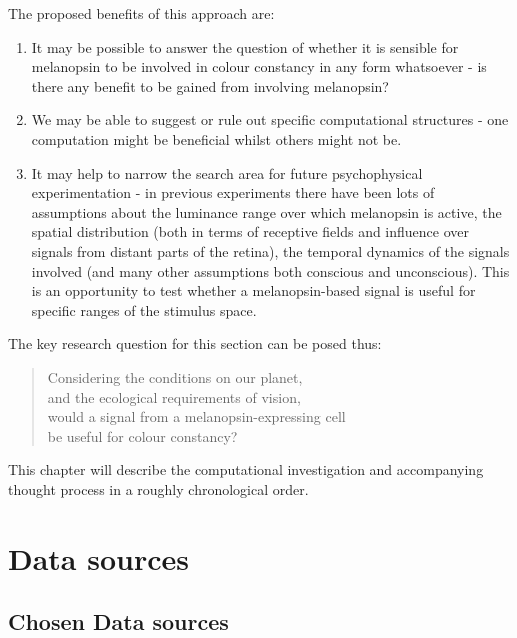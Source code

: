 \noindent The proposed benefits of this approach are: 
\begin{enumerate}
    \item It may be possible to answer the question of whether it is sensible for melanopsin to be involved in colour constancy in any form whatsoever - is there any benefit to be gained from involving melanopsin?
    \item We may be able to suggest or rule out specific computational structures - one computation might be beneficial whilst others might not be.
    \item It may help to narrow the search area for future psychophysical experimentation - in previous experiments there have been lots of assumptions about the luminance range over which melanopsin is active, the spatial distribution (both in terms of receptive fields and influence over signals from distant parts of the retina), the temporal dynamics of the signals involved (and many other assumptions both conscious and unconscious). This is an opportunity to test whether a melanopsin-based signal is useful for specific ranges of the stimulus space.
\end{enumerate}

\noindent The key research question for this section can be posed thus:

\begin{quote}
\centering 
Considering the conditions on our planet, \\
and the ecological requirements of vision, \\
would a signal from a melanopsin-expressing cell \\
be useful for colour constancy?
\end{quote}

This chapter will describe the computational investigation and accompanying thought process in a roughly chronological order.

\section{Data sources}



\subsection{Chosen Data sources}


